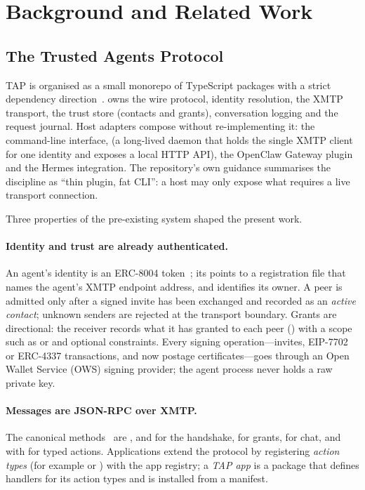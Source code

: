 \section{Background and Related Work}
\label{sec:background}

\subsection{The Trusted Agents Protocol}

TAP is organised as a small monorepo of TypeScript packages with a strict dependency
direction~\cite{tap-repo}.  owns the wire protocol, identity resolution, the
XMTP transport, the trust store (contacts and grants), conversation logging and the
request journal. Host adapters compose  without re-implementing it: the
 command-line interface,  (a long-lived daemon that holds the single
XMTP client for one identity and exposes a local HTTP API), the OpenClaw Gateway plugin and
the Hermes integration. The repository's own guidance summarises the discipline as
``thin plugin, fat CLI'': a host may only expose what requires a live transport
connection.

Three properties of the pre-existing system shaped the present work.

\paragraph{Identity and trust are already authenticated.}
An agent's identity is an ERC-8004 token~\cite{erc8004}; its  points to a
registration file that names the agent's XMTP endpoint address, and 
identifies its owner. A peer is admitted only after a signed invite has been exchanged and
recorded as an \emph{active contact}; unknown senders are rejected at the transport
boundary. Grants are directional: the receiver records what it has granted to each peer
() with a scope such as  or 
and optional constraints. Every signing operation---invites, EIP-7702 or ERC-4337
transactions, and now postage certificates---goes through an Open Wallet Service (OWS)
signing provider; the agent process never holds a raw private key.

\paragraph{Messages are JSON-RPC over XMTP.}
The canonical methods~\cite{jsonrpc} are ,
 and  for the handshake,
 for grants,  for chat, and
 with  for typed actions. Applications extend the
protocol by registering \emph{action types} (for example  or
) with the app registry; a \emph{TAP app} is a package that
defines handlers for its action types and is installed from a manifest.

